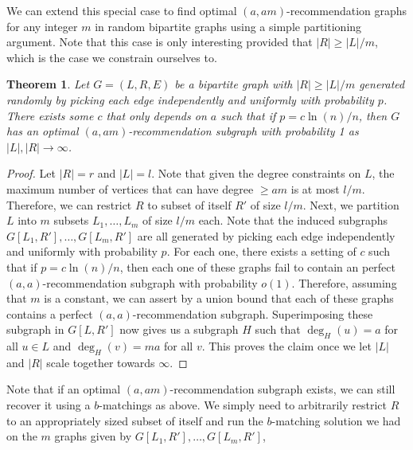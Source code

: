 \documentclass[11pt]{article}
\newtheorem{thm}{Theorem}
\begin{document}
We can extend this special case to find optimal $(a,am)$-recommendation graphs for any integer $m$ in random bipartite graphs using a simple partitioning argument. Note that this case is only interesting provided that $|R|\geq |L|/m$, which is the case we constrain ourselves to.

\begin{thm}
Let $G=(L,R,E)$ be a bipartite graph with $|R|\geq |L|/m$ generated randomly by picking each edge independently and uniformly with probability $p$. There exists some $c$ that only depends on $a$ such that if $p=c\ln(n)/n$, then $G$ has an optimal $(a,am)$-recommendation subgraph with probability 1 as $|L|,|R|\to\infty$.
\end{thm}
\begin{proof}
Let $|R|=r$ and $|L|=l$. Note that given the degree constraints on $L$, the maximum number of vertices that can have degree $\geq am$ is at most $l/m$. Therefore, we can restrict $R$ to subset of itself $R'$ of size $l/m$. Next, we partition $L$ into $m$ subsets $L_1,\ldots, L_m$ of size $l/m$ each. Note that the induced subgraphs $G[L_1,R'], \ldots, G[L_m,R']$ are all generated by picking each edge independently and uniformly with probability $p$. For each one, there exists a setting of $c$ such that if $p=c\ln(n)/n$, then each one of these graphs fail to contain an perfect $(a,a)$-recommendation subgraph with probability $o(1)$. Therefore, assuming that $m$ is a constant, we can assert by a union bound that each of these graphs contains a perfect $(a,a)$-recommendation subgraph. Superimposing these subgraph in $G[L,R']$ now gives us a subgraph $H$ such that $\deg_H(u) = a$ for all $u\in L$ and $\deg_H(v)=ma$ for all $v$. This proves the claim once we let $|L|$ and $|R|$ scale together towards $\infty$.
\end{proof}

Note that if an optimal $(a,am)$-recommendation subgraph exists, we can still recover it using a $b$-matchings as above. We simply need to arbitrarily restrict $R$ to an appropriately sized subset of itself and run the $b$-matching solution we had on the $m$ graphs given by $G[L_1,R'], \ldots, G[L_m,R']$,




{}

\end{document}
